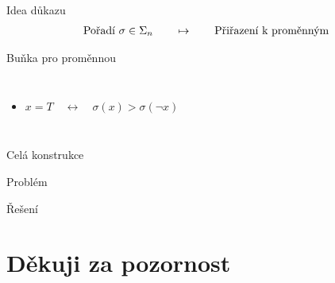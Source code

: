 \documentclass [14pt,xcolor=dvipsnames,aspectratio=169]{beamer}
\begin{document}
\begin{frame}{Idea důkazu}
    \begin{align*}
        \text{Pořadí $ \sigma \in \Sigma_n $}\qquad \mapsto \qquad \text{Přiřazení k proměnným}
    \end{align*}
    
\end{frame}

\begin{frame}{Buňka pro proměnnou}
\begin{columns}
 \begin{itemize}
     \item<2-> $x=T \quad \leftrightarrow\quad \sigma(x) > \sigma(\lnot x)$
 \end{itemize}
    
\end{columns}
\end{frame}

\begin{frame}{Celá konstrukce}
    
\end{frame}

\begin{frame}{Problém}
    
\end{frame}

\begin{frame}{Řešení}
    
\end{frame}

\section*{Děkuji za pozornost}
\end{document}

